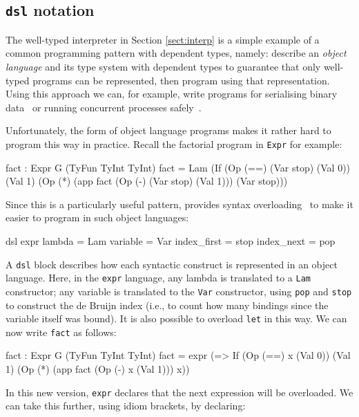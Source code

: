 \subsection{\texttt{dsl} notation}

The well-typed interpreter in Section \ref{sect:interp} is a simple example of
a common programming pattern with dependent types, namely: describe an
\emph{object language}
and its type system with dependent types to guarantee that only well-typed programs
can be represented, then program using that representation. Using this approach
we can, for example, write programs for serialising binary data~\cite{plpv11} or
running concurrent processes safely~\cite{cbconc-fi}.

Unfortunately, the form of object language programs makes it rather hard to program
this way in practice. Recall the factorial program in \texttt{Expr} for example:

\begin{code}
fact : Expr G (TyFun TyInt TyInt)
fact = Lam (If (Op (==) (Var stop) (Val 0))
               (Val 1) (Op (*) (app fact (Op (-) (Var stop) (Val 1))) 
                               (Var stop)))
\end{code}

\noindent
Since this is a particularly useful pattern, \Idris{} provides syntax
overloading~\cite{res-dsl-padl12} to make it easier to program in such
object languages:

\begin{code}
dsl expr
    lambda      = Lam
    variable    = Var
    index_first = stop
    index_next  = pop
\end{code} 

\noindent
A \texttt{dsl} block describes how each syntactic construct is represented in an
object language. Here, in the \texttt{expr} language, any \Idris{} lambda is
translated to a \texttt{Lam} constructor; any variable is translated to the
\texttt{Var} constructor, using \texttt{pop} and \texttt{stop} to construct the
de Bruijn index (i.e., to count how many bindings since the variable itself was bound).
It is also possible to overload \texttt{let} in this way. We can now write \texttt{fact}
as follows:

\begin{code}
fact : Expr G (TyFun TyInt TyInt)
fact = expr (\x => If (Op (==) x (Val 0))
                      (Val 1) (Op (*) (app fact (Op (-) x (Val 1))) x))
\end{code} 

\noindent
In this new version, \texttt{expr} declares that the next expression will be overloaded.
We can take this further, using idiom brackets, by declaring:

